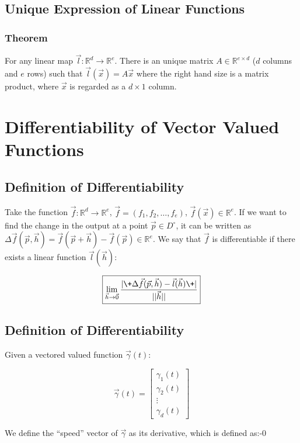 \documentclass[11 pt, twoside]{article}
\begin{document}
\subsection{Unique Expression of Linear Functions}
\subsubsection{Theorem}
For any linear map $\vec{l}: \mathbb{R}^d \to \mathbb{R}^e$.
There is an unique matrix $A \in \mathbb{R}^{e \times d}$ ($d$ columns and
$e$ rows) such that $\vec{l}(\vec{x}) = A\vec{x}$ where the right hand size is a
matrix product, where $\vec{x}$ is regarded as a $d \times 1$ column.

\section{Differentiability of Vector Valued Functions}
\subsection{Definition of Differentiability}
Take the function $\vec{f}: \mathbb{R}^d \to \mathbb{R}^e$, $\vec{f} =
(f_1, f_2, \dots, f_e)$, $\vec{f}(\vec{x}) \in \mathbb{R}^e$. If we
want to find the change in the output at a point $\vec{p} \in D^\circ$, it can
be written as $\Delta \vec{f}(\vec{p}, \vec{h}) =
\vec{f}(\vec{p} + \vec{h}) - \vec{f}(\vec{p}) \in \mathbb{R}^e$. We say that
$\vec{f}$ is differentiable if there exists a linear function $\vec{l}(\vec{h})$:

$$\boxed{\lim_{\vec{h}\to \vec{0}} \frac{|\+\Delta \vec{f}(\vec{p}, \vec{h}) -
\vec{l}(\vec{h})\+|}{||\vec{h}||}}$$

\subsection{Definition of Differentiability}
Given a vectored valued function $\vec{\gamma}(t)$:

\begin{equation*}
    \vec{\gamma}(t) = \left[
    \begin{array}{c}
        \gamma_1 (t)\\
        \gamma_2 (t)\\
        \vdots\\
        \gamma_d (t)
    \end{array} \right]
\end{equation*}

We define the ``speed'' vector of $\vec{\gamma}$ as its derivative, which is
defined as:-0
\end{document}
